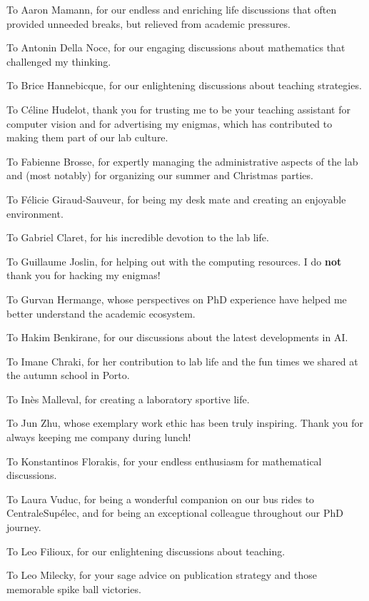 To Aaron Mamann, for our endless and enriching life discussions that often provided unneeded breaks, but relieved from academic pressures.


To Antonin Della Noce, for our engaging discussions about mathematics that challenged my thinking.

To Brice Hannebicque, for our enlightening discussions about teaching strategies.

To Céline Hudelot, thank you for trusting me to be your teaching assistant for computer vision and for advertising my enigmas, which has contributed to making them part of our lab culture.

To Fabienne Brosse, for expertly managing the administrative aspects of the lab and (most notably) for organizing our summer and Christmas parties.

To Félicie Giraud-Sauveur, for being my desk mate and creating an enjoyable environment.

To Gabriel Claret, for his incredible devotion to the lab life.

To Guillaume Joslin, for helping out with the computing resources.
I do \textbf{not} thank you for hacking my enigmas!

To Gurvan Hermange, whose perspectives on PhD experience have helped me better understand the academic ecosystem.

To Hakim Benkirane, for our discussions about the latest developments in AI.

To Imane Chraki, for her contribution to lab life and the fun times we shared at the autumn school in Porto.

To Inès Malleval, for creating a laboratory sportive life.

To Jun Zhu, whose exemplary work ethic has been truly inspiring.
Thank you for always keeping me company during lunch!

To Konstantinos Florakis, for your endless enthusiasm for mathematical discussions.

To Laura Vuduc, for being a wonderful companion on our bus rides to CentraleSupélec, and for being an exceptional colleague throughout our PhD journey.

To Leo Filioux, for our enlightening discussions about teaching.

To Leo Milecky, for your sage advice on publication strategy and those memorable spike ball victories.

